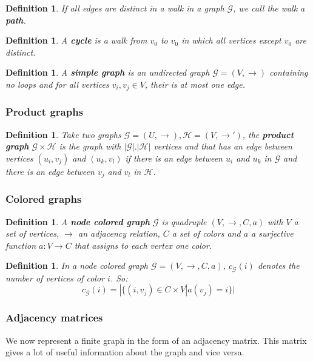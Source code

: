 \documentclass[a4paper,11pt]{report}
\newtheorem{definition}[theorem]{Definition}
\newcommand{\graf}{\mathscr{G}}
\newcommand{\grafeen}{\mathscr{H}}
\begin{document}
 \begin{definition}
   If all edges are distinct in a  walk in a graph $\graf$, we call the walk a \textbf{path}.
 \end{definition}
 
 \begin{definition}
   A \textbf{cycle} is a walk from $v_0$ to $v_0$ in which all vertices except $v_0$ are distinct. \end{definition}
  
  


\begin{definition}\label{simplegraph} A \textbf{simple graph} is an undirected graph $\graf=(V,\to)$ containing no loops and for all vertices $v_i, v_j \in V$, their is at most one edge.\end{definition}
 
 \subsubsection{Product graphs}
 \begin{definition}\label{productgraph}
   Take two graphs $\graf=(U,\to), \grafeen=(V,\to')$, the \textbf{product graph} $\graf \times \grafeen$ 
   is the graph with $|\graf|.|\grafeen|$ vertices and that has an edge between 
   vertices $(u_i, v_j)$ and $(u_k, v_l)$ if there is an edge between $u_i$ and $u_k$ in $\graf$ and there is an 
   edge between $v_j$ and $v_l$ in $\grafeen$. 
 \end{definition}
 
 \subsubsection{Colored graphs}\label{colored}
 \begin{definition}\label{defcolor}
   A \textbf{node colored graph} $\graf$ is quadruple  $(V, \to, C, a)$ with $V$ 
   a set of vertices, $\to$ an adjacency relation, $C$ a set of colors and $a$ 
   a surjective function $a: V \to C$ that assigns to each vertex one color.
 \end{definition}
 \begin{definition}
   In a node colored graph $\graf = (V, \to, C, a) $, $c_\graf(i)$ denotes the number of vertices of 
   color $i$. So:
   $$c_\graf(i) = |\{(i, v_j) \in C \times V | a(v_j) = i\}|$$
 \end{definition}

 \subsubsection{Adjacency matrices}
 We now represent a finite graph in the form of an adjacency matrix. This 
 matrix gives a lot of useful information about the graph and vice versa.
 
\end{document}
